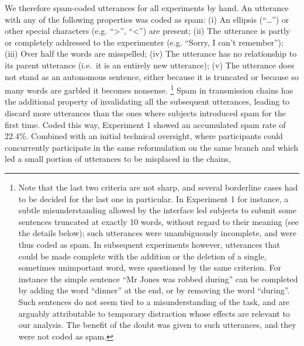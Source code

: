 We therefore spam-coded utterances for all experiments by hand. An utterance
with any of the following properties was coded as spam:
(i) 
  An ellipsis (\enquote{\ldots{}}) or other special characters (e.g.
  \enquote{\textgreater{}}, \enquote{\textless{}}) are present;
(ii)
  The utterance is partly or completely addressed to the experimenter
  (e.g. \enquote{Sorry, I can't remember});
(iii)
  Over half the words are misspelled;
(iv)
  The utterance has no relationship to its parent utterance (i.e.~it is
  an entirely new utterance);
(v)
  The utterance does not stand as an autonomous sentence, either because
  it is truncated or because so many words are garbled it becomes
  nonsense.
\footnote{Note that the last two criteria are not sharp, and several borderline
cases had to be decided for the last one in particular. In Experiment 1
for instance, a subtle misunderstanding allowed by the interface led
subjects to submit some sentences truncated at exactly 10 words, without
regard to their meaning (see the details below); such utterances were
unambiguously incomplete, and were thus coded as spam. In subsequent
experiments however, utterances that could be made complete with the
addition or the deletion of a single, sometimes unimportant word, were
questioned by the same criterion. For instance the simple sentence
\enquote{Mr Jones was robbed during} can be completed by adding the word
\enquote{dinner} at the end, or by removing the word \enquote{during}.
Such sentences do not seem tied to a misunderstanding of the task, and
are arguably attributable to temporary distraction whose effects are
relevant to our analysis. The benefit of the doubt was given to such
utterances, and they were not coded as spam.}
Spam in transmission chains has the additional property of invalidating
all the subsequent utterances, leading to discard more utterances than the ones where subjects introduced spam for the first time. 
Coded this way, Experiment 1 showed an accumulated spam rate of 22.4\%.
Combined with an initial technical oversight, where participants could concurrently participate in the same reformulation on the same branch and which led a small portion of
utterances to be misplaced in the chains,
